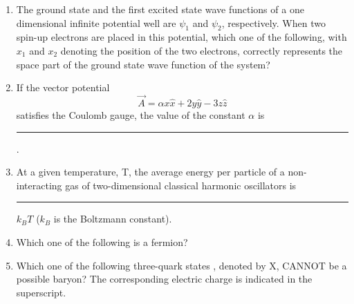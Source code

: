 \documentclass[journal,12pt,onecolumn]{IEEEtran}
\theoremstyle{remark}
\begin{document}
\begin{enumerate}
\item The ground state and the first excited state wave functions of a one dimensional infinite potential well are $\psi_1$ and $\psi_2$, respectively. When two spin-up electrons are placed in this potential, which one of the following, with $x_1$ and $x_2$ denoting the position of the two electrons, correctly represents the space part of the ground state wave function of the system?
\hfill{} \begin{enumerate}  \end{enumerate}

\item If the vector potential $$\vec{A} = \alpha x \hat{x} + 2y \hat{y} - 3z \hat{z}$$ satisfies the Coulomb gauge, the value of the constant $\alpha$ is \rule{3cm}{0.4pt}.\hfill{}

\item At a given temperature, T, the average energy per particle of a non-interacting gas of two-dimensional classical harmonic oscillators is \rule{3cm}{0.4pt} $k_B T$ ($k_B$ is the Boltzmann constant).\hfill{}

\item Which one of the following is a fermion?
\hfill{} \begin{enumerate}  \end{enumerate}

\item Which one of the following three-quark states , denoted by X, CANNOT be a possible baryon? The corresponding electric charge is indicated in the superscript.
\hfill{} \begin{enumerate}  \end{enumerate}


\end{enumerate}
\end{document}
